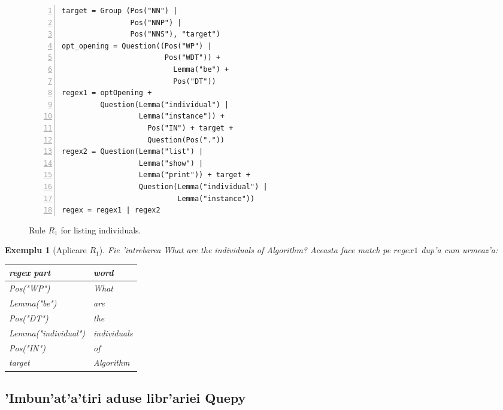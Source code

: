 \documentclass[12pt,a4paper,twoside]{report}
\newtheorem{example}{Exemplu}
\begin{document}
\begin{figure}[h]
\centering
\begin{lstlisting}[basicstyle=\footnotesize, numbers=left, xleftmargin=.05\textwidth]
target = Group (Pos("NN") | 
                Pos("NNP") | 
                Pos("NNS"), "target")
opt_opening = Question((Pos("WP") | 
                        Pos("WDT")) + 
                          Lemma("be") + 
                          Pos("DT"))
regex1 = optOpening + 
         Question(Lemma("individual") | 
                  Lemma("instance")) + 
                    Pos("IN") + target + 
                    Question(Pos("."))
regex2 = Question(Lemma("list") | 
                  Lemma("show") | 
                  Lemma("print")) + target +   
                  Question(Lemma("individual") |
                           Lemma("instance"))
regex = regex1 | regex2
  \end{lstlisting}
        \caption{Rule $R_1$ for listing individuals.}
      \label{fig:r1}
  \end{figure}
  
  \begin{example}[Aplicare $R_1$] 
  Fie 'intrebarea {\it What are the individuals of Algorithm?}
  Aceasta face match pe $regex1$ dup'a cum urmeaz'a:
  
    \begin{center}
      \begin{tabular}{ll}
      regex part & word\\ \hline
      
  {\it Pos("WP")} & What\\
  {\it Lemma("be")} & are\\
  {\it Pos("DT")} & the\\
  {\it Lemma("individual")} & individuals\\
  {\it Pos("IN")} & of\\
  {\it target} & Algorithm\\
       \end{tabular}
       \end{center}
        \vspace{0.3cm}
   \end{example}

\subsection{'Imbun'at'a'tiri aduse libr'ariei Quepy}
\end{document}
